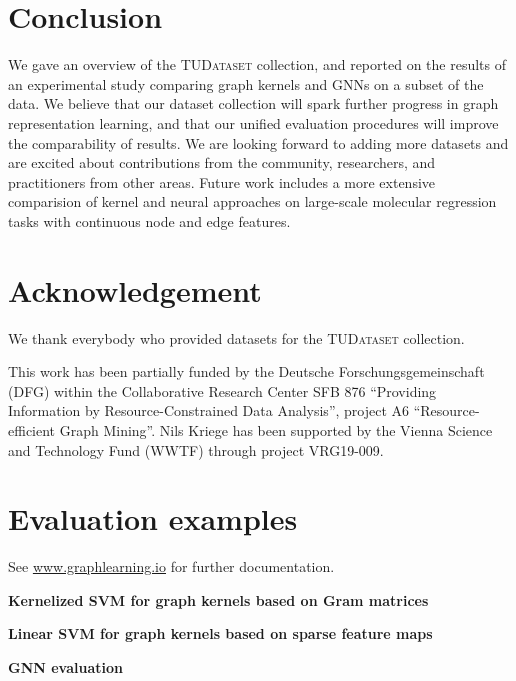 \documentclass{article}
\newcommand{\xhdr}[1]{{\noindent\bfseries #1}}
\theoremstyle{definition}
\begin{document}
\section{Conclusion}

We gave an overview of the \textsc{TUDataset} collection, and reported on the results of an experimental study comparing graph kernels and GNNs on a subset of the data. We believe that our dataset collection will spark further progress in graph representation learning, and that our unified evaluation procedures will improve the comparability of results. We are looking forward to adding more datasets and are excited about contributions from the community, researchers, and practitioners from other areas. Future work includes a more extensive comparision of kernel and neural approaches on large-scale molecular regression tasks with continuous node and edge features.

\section{Acknowledgement}

We thank everybody who provided datasets for the  \textsc{TUDataset} collection.

This work has been partially funded by the Deutsche Forschungsgemeinschaft (DFG) within 
the Collaborative Research Center SFB 876 ``Providing Information by 
Resource-Constrained Data Analysis'', project A6 ``Resource-efficient Graph Mining''.
Nils Kriege has been supported by the Vienna Science and Technology Fund (WWTF) 
through project VRG19-009.




\appendix

\onecolumn



\section{Evaluation examples}\label{evalcode}

See \url{www.graphlearning.io} for further documentation.

\xhdr{Kernelized SVM for graph kernels based on Gram matrices}


\xhdr{Linear SVM for graph kernels based on sparse feature maps}


\xhdr{GNN evaluation}

\end{document}
